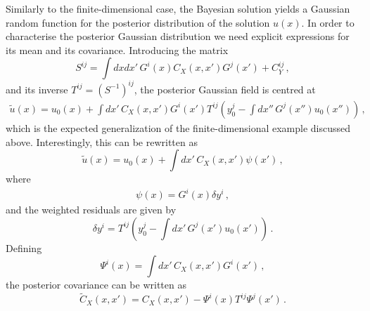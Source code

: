 Similarly to the finite-dimensional case, the Bayesian solution yields a
Gaussian random function for the posterior distribution of the solution $u(x)$.
In order to characterise the posterior Gaussian distribution we need explicit
expressions for its mean and its covariance. Introducing the matrix
\begin{equation}
  \label{eq:Smatrix}
  S^{ij} =
  \int dx dx'\, G^i(x) C_{X}(x,x') G^j(x') + C_{Y}^{ij}\, ,
\end{equation}
and its inverse $T^{ij}=\left(S^{-1}\right)^{ij}$, the posterior Gaussian field
is centred at
\begin{align}
  \label{eq:PostMeanFunc}
  \tilde{u}(x) = u_0(x) + 
  \int dx'\, C_{X}(x,x') G^i(x') T^{ij} \left(
    y_0^j - \int dx''\, G^j(x'') u_0(x'') 
  \right)\, ,
\end{align}
which is the expected generalization of the finite-dimensional example discussed
above. Interestingly, this can be rewritten as
\begin{equation}
  \label{eq:TowardsBackus}
  \tilde{u}(x) = u_0(x) + 
  \int dx'\, C_{X}(x,x') \psi(x')\, ,
\end{equation}
where 
\begin{eqnarray}
  \label{eq:PsiDef}
  \psi(x) = G^i(x) \delta y^i\, ,
\end{eqnarray}
and the weighted residuals are given by
\begin{equation}
  \label{eq:DeltaYDef}
  \delta y^i = T^{ij} \left(
  y_0^j - \int dx'\, G^j(x') u_0(x')
  \right)\, .
\end{equation}
Defining 
\begin{equation}
  \label{eq:CapitalPsi}
  \Psi^i(x) = \int dx'\, C_{X}(x,x') G^i(x')\, ,
\end{equation}
the posterior covariance can be written as
\begin{equation}
  \label{eq:PostCovFunc}
  \tilde{C}_{X}(x,x') = 
  C_{X}(x,x') - \Psi^i(x) T^{ij} \Psi^j(x')\, .
\end{equation}

